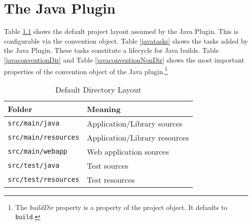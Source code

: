 \chapter{The Java Plugin} %
\label{cha:the_java_plugin}
Table \ref{javalayout} shows the default project layout assumed by the Java Plugin. This is configurable via the convention object. Table \ref{javatasks} shows the tasks added by the Java Plugin. These tasks constitute a lifecycle for Java builds. Table \ref{javaconventionDir} and Table \ref{javaconventionNonDir} shows the most important properties of the convention object of the Java plugin.\footnote{The \emph{buildDir} property is a property of the project object. It defaults to \texttt{build}.}

\begin{table}
	\begin{center}
	\begin{tabular}{|l|l|} \hline
	\textbf{Folder} & \textbf{Meaning} \\ \hline
	\texttt{src/main/java} & Application/Library sources \\ \hline
	\texttt{src/main/resources} & Application/Library resources \\ \hline
	\texttt{src/main/webapp} & Web application sources \\ \hline
	\texttt{src/test/java} & Test sources \\ \hline
	\texttt{src/test/resources} & Test resources \\ \hline
	\end{tabular}
	\end{center}
	\caption{Default Directory Layout}	
	\label{javalayout}
\end{table}

